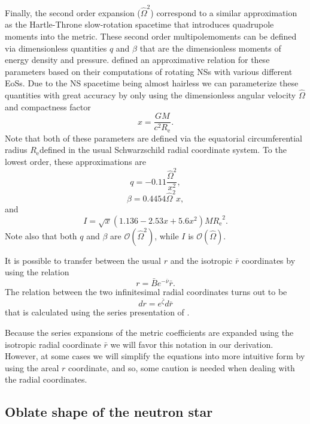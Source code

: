 \documentclass[iop, usenatbib]{emulateapj}
\newcommand{\be}{\begin{equation}}
\newcommand{\ee}{\end{equation}}
\newcommand{\Req}{\ensuremath{R_{\mathrm{e}}}}
\newcommand{\sch}{Schwarzschild }
\newcommand{\rb}{\ensuremath{\bar{r}}}
\newcommand{\Ob}{\ensuremath{\hat{\Omega}}}
\newcommand{\nub}{\ensuremath{\bar{\nu}}}
\newcommand{\zetab}{\ensuremath{\bar{\zeta}}}
\newcommand{\Bb}{\ensuremath{\bar{B}}}
\begin{document}
Finally, the second order expansion ($\Ob^2$) correspond to a similar approximation as the Hartle-Throne slow-rotation spacetime that introduces quadrupole moments into the metric.
These second order multipolemoments can be defined via dimensionless quantities $q$ and $\beta$ that are the dimensionless moments of energy density and pressure.
\citet{aGM14} defined an approximative relation for these parameters based on their computations of rotating NSs with various different EoSs.
Due to the NS spacetime being almost hairless we can parameterize these quantities with great accuracy by only using the dimensionless angular velocity $\Ob$ and compactness factor
\be
x = \frac{G M}{c^2 \Req}.
\ee
Note that both of these parameters are defined via the equatorial circumferential radius \Req defined in the usual \sch radial coordinate system.
To the lowest order, these approximations are
\be
q = -0.11 \frac{\Ob^2}{x^2},
\ee
\be
\beta = 0.4454 \Ob^2 x,
\ee
and
\be
I = \sqrt{x} (1.136 - 2.53 x + 5.6 x^2) M \Req^2.
\ee
Note also that both $q$ and $\beta$ are $\mathcal{O}(\Ob^2)$, while $I$ is $\mathcal{O}(\Ob)$.
    
It is possible to transfer between the usual $r$ and the isotropic $\rb$ coordinates by using the relation \citep{FIP86}
\be\label{eq:rb2r}
r = \Bb e^{-\nub} \rb.
\ee
The relation between the two infinitesimal radial coordinates turns out to be
\be\label{eq:drb2dr}
dr = e^{\zetab} d\rb
\ee
that is calculated using the series presentation of \cite{BI76}.

Because the series expansions of the metric coefficients are expanded using the isotropic radial coordinate $\rb$ we will favor this notation in our derivation.
However, at some cases we will simplify the equations into more intuitive form by using the areal $r$ coordinate, and so, some caution is needed when dealing with the radial coordinates.


\subsection{Oblate shape of the neutron star}
\end{document}
